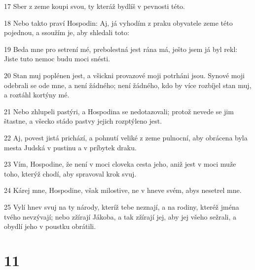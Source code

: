 \par 17 Sber z zeme koupi svou, ty kteráž bydlíš v pevnosti této.
\par 18 Nebo takto praví Hospodin: Aj, já vyhodím z praku obyvatele zeme této pojednou, a ssoužím je, aby shledali toto:
\par 19 Beda mne pro setrení mé, prebolestná jest rána má, ješto jsem já byl rekl: Jiste tuto nemoc budu moci snésti.
\par 20 Stan muj poplénen jest, a všickni provazové moji potrháni jsou. Synové moji odebrali se ode mne, a není žádného; není žádného, kdo by více rozbíjel stan muj, a roztáhl kortýny mé.
\par 21 Nebo zhlupeli pastýri, a Hospodina se nedotazovali; protož nevede se jim štastne, a všecko stádo pastvy jejich rozptýleno jest.
\par 22 Aj, povest jistá prichází, a pohnutí veliké z zeme pulnocní, aby obrácena byla mesta Judská v pustinu a v príbytek draku.
\par 23 Vím, Hospodine, že není v moci cloveka cesta jeho, aniž jest v moci muže toho, kterýž chodí, aby spravoval krok svuj.
\par 24 Kárej mne, Hospodine, však milostive, ne v hneve svém, abys nesetrel mne.
\par 25 Vylí hnev svuj na ty národy, kteríž tebe neznají, a na rodiny, kteréž jména tvého nevzývají; nebo zžírají Jákoba, a tak zžírají jej, aby jej všeho sežrali, a obydlí jeho v poustku obrátili.

\chapter{11}

